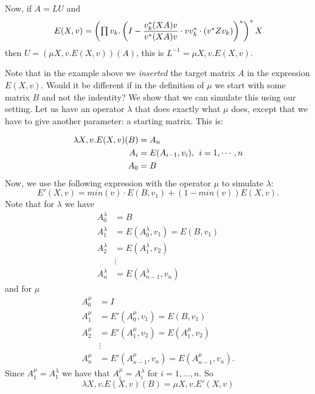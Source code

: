 Now, if $A=LU$ and $$E(X, v)=\left(\textstyle\prod v_k.\left(I-\dfrac{v_k^*(XA)v}{v^*(XA)v}\cdot vv_k^*\cdot\left(v^*Zv_k\right)\right)^*\right)^*X$$
then $U=(\mu X, v.E(X,v))(A)$, this is $L^{-1}=\mu X, v.E(X,v)$.

Note that in the example above we \textit{inserted} the target matrix $A$ in the expression $E(X,v)$. Would it be different if in the definition of $\mu$ we start with some matrix $B$ and not the indentity? We show that we can simulate this using our setting. Let us have an operator $\lambda$ that does exactly what $\mu$ does, except that we have to give another parameter: a starting matrix. This is:

\begin{align*}
\lambda X, v.E(X,v)(B)&=A_n \\
A_i&=E(A_{i-1}, v_{i}),\hspace{1ex}i=1,\cdots, n \\
A_0&=B
\end{align*}
Now, we use the following expression with the operator $\mu$ to simulate $\lambda$: $$E'(X,v)=min(v)\cdot E(B,v_1)+(1-min(v))E(X,v).$$
Note that for $\lambda$ we have 
\begin{align*}
	A^{\lambda}_0&=B \\
	A^{\lambda}_1&=E(A^{\lambda}_0,v_1)=E(B,v_1) \\
	A^{\lambda}_2&=E(A^{\lambda}_1,v_2) \\
	&\vdots \\
	A^{\lambda}_n&=E(A^{\lambda}_{n-1}, v_n)
\end{align*}
and for $\mu$
\begin{align*}
	A^{\mu}_0&=I \\
	A^{\mu}_1&=E'(A^{\mu}_0,v_1)=E(B,v_1) \\
	A^{\mu}_2&=E'(A^{\mu}_1,v_2)=E(A^{\mu}_1,v_2) \\
	&\vdots \\
	A^{\mu}_n&=E'(A^{\mu}_{n-1}, v_n)=E(A^{\mu}_{n-1}, v_n).
\end{align*}
Since $A^{\mu}_1=A^{\lambda}_1$ we have that $A^{\mu}_i=A^{\lambda}_i$ for $i=1,\ldots,n$. So $$\lambda X, v.E(X,v)(B)=\mu X, v.E'(X,v)$$

